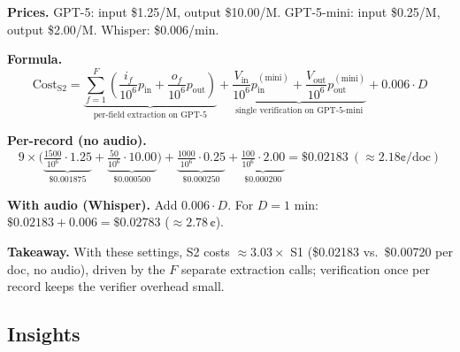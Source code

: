 \textbf{Prices.} GPT-5: input \$1.25/M, output \$10.00/M. GPT-5-mini: input \$0.25/M, output \$2.00/M. Whisper: \$0.006/min.

\textbf{Formula.}
\[
\text{Cost}_{\text{S2}} =
\underbrace{
\sum_{f=1}^{F}\!\left(\frac{i_f}{10^6}p_{\text{in}}+\frac{o_f}{10^6}p_{\text{out}}\right)
}_{\text{per-field extraction on GPT-5}}
+
\underbrace{
\frac{V_{\text{in}}}{10^6}p^{(\text{mini})}_{\text{in}}+\frac{V_{\text{out}}}{10^6}p^{(\text{mini})}_{\text{out}}
}_{\text{single verification on GPT-5-mini}}
+0.006\cdot D
\]

\textbf{Per-record (no audio).}
\[
9\times\Big(
\underbrace{\tfrac{1500}{10^6}\!\cdot\!1.25}_{\$0.001875}
+\underbrace{\tfrac{50}{10^6}\!\cdot\!10.00}_{\$0.000500}
\Big)
+\underbrace{\tfrac{1000}{10^6}\!\cdot\!0.25}_{\$0.000250}
+\underbrace{\tfrac{100}{10^6}\!\cdot\!2.00}_{\$0.000200}
=\mathbf{\$0.02183}\ (\approx 2.18\text{¢/doc})
\]

\textbf{With audio (Whisper).} Add $0.006\cdot D$. For $D{=}1$ min: $\$0.02183+0.006=\mathbf{\$0.02783}$ (\(\approx 2.78\,\text{¢}\)).

\textbf{Takeaway.} With these settings, S2 costs \(\approx 3.03\times\) S1 (\$0.02183 vs.\ \$0.00720 per doc, no audio), driven by the $F$ separate extraction calls; verification once per record keeps the verifier overhead small.



\subsection*{Insights}

